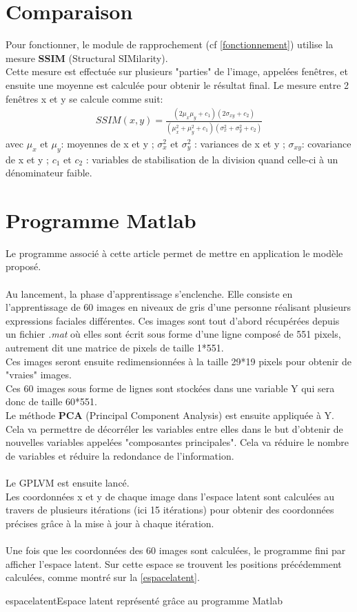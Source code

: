 \documentclass[poster]{polytech/polytech}
\begin{document}
\section{Comparaison}
Pour fonctionner, le module de rapprochement (cf \autoref{fonctionnement}) utilise la mesure \textbf{SSIM} (Structural SIMilarity).\\
Cette mesure est effectuée sur plusieurs "parties" de l'image, appelées fenêtres, et ensuite une moyenne est calculée pour obtenir le résultat final. Le mesure entre 2 fenêtres x et y se calcule comme suit:
\begin{align*}
SSIM(x,y)=\frac{(2\mu _x\mu _y+c_1)(2\sigma _{xy}+c_2)}{(\mu ^2_x+\mu ^2_y+c_1)(\sigma ^2_x+\sigma ^2_y+c_2)}
\end{align*}
avec $\mu _x$ et $\mu _y$: moyennes de x et y ; $\sigma ^2_x$ et $\sigma ^2_y$ : variances de x et y ; $\sigma _{xy}$: covariance de x et y ; $c_1$ et $c_2$ : variables de stabilisation de la division quand celle-ci à un dénominateur faible.

\section{Programme Matlab}
Le programme associé à cette article permet de mettre en application le modèle proposé.\\
\\
Au lancement, la phase d'apprentissage s'enclenche. Elle consiste en l'apprentissage de 60 images en niveaux de gris d'une personne réalisant plusieurs expressions faciales différentes. Ces images sont tout d'abord récupérées depuis un fichier \textit{.mat} où elles sont écrit sous forme d'une ligne composé de 551 pixels, autrement dit une matrice de pixels de taille 1*551.\\
Ces images seront ensuite redimensionnées à la taille 29*19 pixels pour obtenir de "vraies" images.\\
Ces 60 images sous forme de lignes sont stockées dans une variable Y qui sera donc de taille 60*551.\\
Le méthode \textbf{PCA} (Principal Component Analysis) est ensuite appliquée à Y. Cela va permettre de décorréler les variables entre elles dans le but d'obtenir de nouvelles variables appelées "composantes principales". Cela va réduire le nombre de variables et réduire la redondance de l'information.\\
\\
Le GPLVM est ensuite lancé.\\
Les coordonnées x et y de chaque image dans l'espace latent sont calculées au travers de plusieurs itérations (ici 15 itérations) pour obtenir des coordonnées précises grâce à la mise à jour à chaque itération.\\
\\
Une fois que les coordonnées des 60 images sont calculées, le programme fini par afficher l'espace latent. Sur cette espace se trouvent les positions précédemment calculées, comme montré sur la \autoref{espacelatent}.
\begin{Figure}{espacelatent}{Espace latent représenté grâce au programme Matlab}
\end{Figure}
\end{document}
